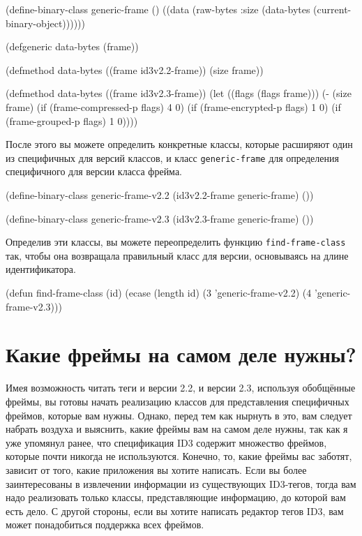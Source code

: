 \begin{myverb}
(define-binary-class generic-frame ()
  ((data (raw-bytes :size (data-bytes (current-binary-object))))))

(defgeneric data-bytes (frame))

(defmethod data-bytes ((frame id3v2.2-frame))
  (size frame))

(defmethod data-bytes ((frame id3v2.3-frame))
  (let ((flags (flags frame)))
    (- (size frame)
       (if (frame-compressed-p flags) 4 0)
       (if (frame-encrypted-p flags) 1 0)
       (if (frame-grouped-p flags) 1 0))))
\end{myverb}

После этого вы можете определить конкретные классы, которые расширяют один из специфичных
для версий классов, и класс \lstinline{generic-frame} для определения специфичного для версии класса
фрейма.

\begin{myverb}
(define-binary-class generic-frame-v2.2 (id3v2.2-frame generic-frame) ())

(define-binary-class generic-frame-v2.3 (id3v2.3-frame generic-frame) ())
\end{myverb}

Определив эти классы, вы можете переопределить функцию \lstinline{find-frame-class} так, чтобы
она возвращала правильный класс для версии, основываясь на длине идентификатора.

\begin{myverb}
(defun find-frame-class (id)
  (ecase (length id)
    (3 'generic-frame-v2.2)
    (4 'generic-frame-v2.3)))
\end{myverb}


\section{Какие фреймы на самом деле нужны?}

Имея возможность читать теги и версии 2.2, и версии 2.3, используя обобщённые фреймы, вы
готовы начать реализацию классов для представления специфичных фреймов, которые вам
нужны. Однако, перед тем как нырнуть в это, вам следует набрать воздуха и выяснить, какие
фреймы вам на самом деле нужны, так как я уже упомянул ранее, что спецификация ID3
содержит множество фреймов, которые почти никогда не используются. Конечно, то, какие
фреймы вас заботят, зависит от того, какие приложения вы хотите написать. Если вы более
заинтересованы в извлечении информации из существующих ID3-тегов, тогда вам надо
реализовать только классы, представляющие информацию, до которой вам есть дело. С другой
стороны, если вы хотите написать редактор тегов ID3, вам может понадобиться поддержка всех
фреймов.

